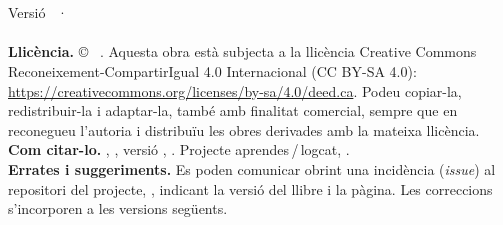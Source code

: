 \thispagestyle{empty}
\vspace*{\fill}
\begin{flushleft}
\small
\textbf{\llibretitol}\\
\llibreautor\\[0.6em]
Versió \llibreversio\ · \llibredata\\
\llibreweb\\[1.2em]

\textbf{Llicència.} © \llibreany\ \llibreautor. Aquesta obra està subjecta a la llicència Creative Commons Reconeixement-CompartirIgual 4.0 Internacional (CC BY-SA 4.0): \url{https://creativecommons.org/licenses/by-sa/4.0/deed.ca}. Podeu copiar-la, redistribuir-la i adaptar-la, també amb finalitat comercial, sempre que en reconegueu l'autoria i distribuïu les obres derivades amb la mateixa llicència.\\[1em]

\textbf{Com citar-lo.} \llibreautor, \emph{\llibretitol}, versió \llibreversio, \llibreany. Projecte aprendes\,/\,logcat, \llibreweb.\\[1em]

\textbf{Errates i suggeriments.} Es poden comunicar obrint una incidència (\emph{issue}) al repositori del projecte, \llibreerrates, indicant la versió del llibre i la pàgina. Les correccions s'incorporen a les versions següents.
\end{flushleft}
\clearpage
